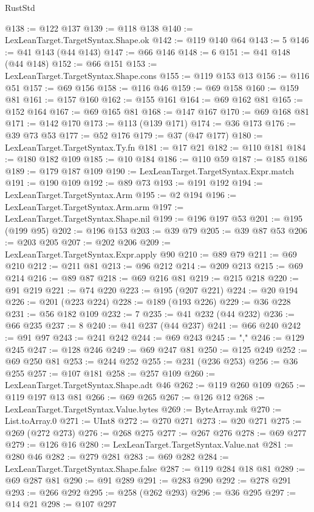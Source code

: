 \begin{lexlean}{RustStd}
\begin{coremodule}
{\begin{coremodule}
{{{{{{{{{{{{{{{{{{{{{{{{{{{{{{@138 := @122 @137
@139 := @118 @138
@140 := LexLeanTarget.TargetSyntax.Shape.ok
@142 := @119 @140 @64
@143 := 5
@146 := @41 @143 (@44 @143)
@147 := @66 @146
@148 := 6
@151 := @41 @148 (@44 @148)
@152 := @66 @151
@153 := LexLeanTarget.TargetSyntax.Shape.cons
@155 := @119 @153 @13
@156 := @116 @51
@157 := @69 @156
@158 := @116 @46
@159 := @69 @158
@160 := @159 @81
@161 := @157 @160
@162 := @155 @161
@164 := @69 @162 @81
@165 := @152 @164
@167 := @69 @165 @81
@168 := @147 @167
@170 := @69 @168 @81
@171 := @142 @170
@173 := @113 (@139 @171)
@174 := @36 @173
@176 := @39 @73 @53
@177 := @52 @176
@179 := @37 (@47 @177)
@180 := LexLeanTarget.TargetSyntax.Ty.fn
@181 := @17 @21
@182 := @110 @181
@184 := @180 @182 @109
@185 := @10 @184
@186 := @110 @59
@187 := @185 @186
@189 := @179 @187 @109
@190 := LexLeanTarget.TargetSyntax.Expr.match
@191 := @190 @109
@192 := @89 @73
@193 := @191 @192
@194 := LexLeanTarget.TargetSyntax.Arm
@195 := @2 @194
@196 := LexLeanTarget.TargetSyntax.Arm.arm
@197 := LexLeanTarget.TargetSyntax.Shape.nil
@199 := @196 @197 @53
@201 := @195 (@199 @95)
@202 := @196 @153
@203 := @39 @79
@205 := @39 @87 @53
@206 := @203 @205
@207 := @202 @206
@209 := LexLeanTarget.TargetSyntax.Expr.apply @90
@210 := @89 @79
@211 := @69 @210
@212 := @211 @81
@213 := @96 @212
@214 := @209 @213
@215 := @69 @214
@216 := @89 @87
@218 := @69 @216 @81
@219 := @215 @218
@220 := @91 @219
@221 := @74 @220
@223 := @195 (@207 @221)
@224 := @20 @194
@226 := @201 (@223 @224)
@228 := @189 (@193 @226)
@229 := @36 @228
@231 := @56 @182 @109
@232 := 7
@235 := @41 @232 (@44 @232)
@236 := @66 @235
@237 := 8
@240 := @41 @237 (@44 @237)
@241 := @66 @240
@242 := @91 @97
@243 := @241 @242
@244 := @69 @243
@245 := ","
@246 := @129 @245
@247 := @128 @246
@249 := @69 @247 @81
@250 := @125 @249
@252 := @69 @250 @81
@253 := @244 @252
@255 := @231 (@236 @253)
@256 := @36 @255
@257 := @107 @181
@258 := @257 @109
@260 := LexLeanTarget.TargetSyntax.Shape.adt @46
@262 := @119 @260 @109
@265 := @119 @197 @13 @81
@266 := @69 @265
@267 := @126 @12
@268 := LexLeanTarget.TargetSyntax.Value.bytes
@269 := ByteArray.mk
@270 := List.toArray.{0}
@271 := UInt8
@272 := @270 @271
@273 := @20 @271
@275 := @269 (@272 @273)
@276 := @268 @275
@277 := @267 @276
@278 := @69 @277
@279 := @126 @16
@280 := LexLeanTarget.TargetSyntax.Value.nat
@281 := @280 @46
@282 := @279 @281
@283 := @69 @282
@284 := LexLeanTarget.TargetSyntax.Shape.false
@287 := @119 @284 @18 @81
@289 := @69 @287 @81
@290 := @91 @289
@291 := @283 @290
@292 := @278 @291
@293 := @266 @292
@295 := @258 (@262 @293)
@296 := @36 @295
@297 := @14 @21
@298 := @107 @297
}}}}}}}}}}}}}}}}}}}}}}}}}}}}}}
\end{coremodule}}
\end{coremodule}
\end{lexlean}
